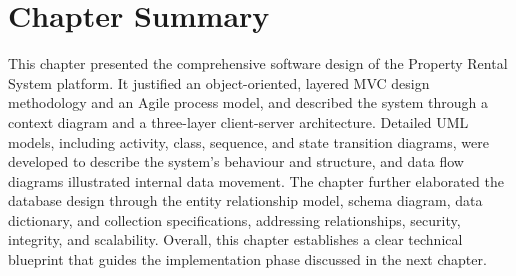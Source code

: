\section{Chapter Summary}

This chapter presented the comprehensive software design of the Property Rental System platform.
It justified an object-oriented, layered MVC design methodology and an Agile
process model, and described the system through a context diagram and a
three-layer client-server architecture. Detailed UML models, including activity,
class, sequence, and state transition diagrams, were developed to describe the
system's behaviour and structure, and data flow diagrams illustrated internal
data movement. The chapter further elaborated the database design through the
entity relationship model, schema diagram, data dictionary, and collection
specifications, addressing relationships, security, integrity, and scalability.
Overall, this chapter establishes a clear technical blueprint that guides the
implementation phase discussed in the next chapter.
